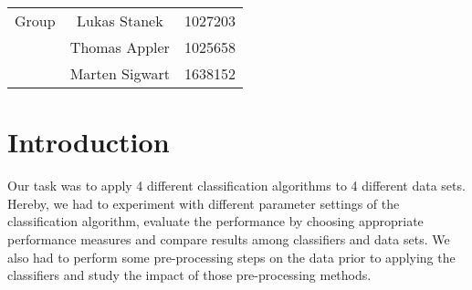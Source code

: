 \documentclass{article}
\begin{document}
\author{ML Exercise 2 - Group 19}
%
%

\maketitle

\begin{center}
\begin{tabular}{l| c r}
Group & Lukas Stanek & 1027203 \\ %
& Thomas Appler & 1025658 \\
& Marten Sigwart & 1638152 \\
\end{tabular}
\end{center}

\section{Introduction}
Our task was to apply 4 different classification algorithms to 4 different data sets. Hereby, we had to experiment with different parameter settings of the classification algorithm, evaluate the performance by choosing appropriate performance measures and compare results among classifiers and data sets. We also had to perform some pre-processing steps on the data prior to applying the classifiers and study the impact of those pre-processing methods.
\end{document}
